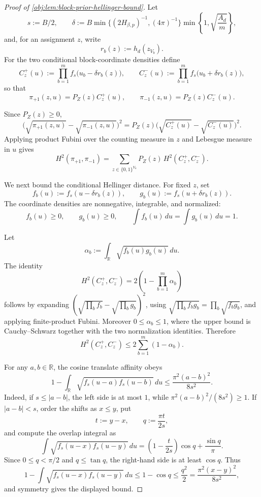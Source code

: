 \documentclass[11pt]{article}
\begin{document}
\begin{proof}[Proof of \cref{obj:lem:block-prior-hellinger-bound}]
Let
\[
s:=B/2,
\qquad
\delta:=B\min\{(2H_{\beta,p})^{-1},(4\pi)^{-1}\}
  \min\left\{1,\sqrt{\frac{A_d}{m}}\right\},
\]
and, for an assignment \(z\), write
\[
r_b(z):=h_d(z_{V_b}) .
\]
For the two conditional block-coordinate densities define
\[
C_z^+(u):=\prod_{b=1}^{m} f_s\bigl(u_b-\delta r_b(z)\bigr),
\qquad
C_z^-(u):=\prod_{b=1}^{m} f_s\bigl(u_b+\delta r_b(z)\bigr),
\]
so that
\[
\pi_{+1}(z,u)=P_Z(z)C_z^+(u),
\qquad
\pi_{-1}(z,u)=P_Z(z)C_z^-(u).
\]

Since \(P_Z(z)\ge0\),
\[
\bigl(\sqrt{\pi_{+1}(z,u)}-\sqrt{\pi_{-1}(z,u)}\bigr)^2
=
P_Z(z)\bigl(\sqrt{C_z^+(u)}-\sqrt{C_z^-(u)}\bigr)^2 .
\]
Applying product Fubini over the counting measure in \(z\) and Lebesgue measure in \(u\) gives
\[
H^2(\pi_{+1},\pi_{-1})
=
\sum_{z\in\{0,1\}^{V_n}}
P_Z(z)\,
H^2(C_z^+,C_z^-).
\]

We next bound the conditional Hellinger distance.  For fixed \(z\), set
\[
f_b(u):=f_s(u-\delta r_b(z)),
\qquad
g_b(u):=f_s(u+\delta r_b(z)).
\]
The coordinate densities are nonnegative, integrable, and normalized:
\[
f_b(u)\ge0,\qquad g_b(u)\ge0,\qquad
\int f_b(u)\,du=\int g_b(u)\,du=1 .
\]

Let
\[
\alpha_b:=\int_{\mathbb R}\sqrt{f_b(u)g_b(u)}\,du .
\]
The identity
\[
H^2(C_z^+,C_z^-)
=
2\left(1-\prod_{b=1}^{m}\alpha_b\right)
\]
follows by expanding
\((\sqrt{\prod_b f_b}-\sqrt{\prod_b g_b})^2\), using
\(\sqrt{\prod_b f_b g_b}=\prod_b\sqrt{f_b g_b}\), and applying finite-product Fubini.  Moreover \(0\le\alpha_b\le1\), where the upper bound is Cauchy--Schwarz together with the two normalization identities.  Therefore
\[
H^2(C_z^+,C_z^-)
\le
2\sum_{b=1}^{m}(1-\alpha_b).
\]

For any \(a,b\in\mathbb R\), the cosine translate affinity obeys
\[
1-\int_{\mathbb R}\sqrt{f_s(u-a)f_s(u-b)}\,du
\le
\frac{\pi^2(a-b)^2}{8s^2}.
\]
Indeed, if \(s\le |a-b|\), the left side is at most \(1\), while
\(\pi^2(a-b)^2/(8s^2)\ge1\).  If \(|a-b|<s\), order the shifts as \(x\le y\), put
\[
t:=y-x,
\qquad
q:=\frac{\pi t}{2s},
\]
and compute the overlap integral as
\[
\int\sqrt{f_s(u-x)f_s(u-y)}\,du
=
\left(1-\frac{t}{2s}\right)\cos q+\frac{\sin q}{\pi}.
\]
Since \(0\le q<\pi/2\) and \(q\le\tan q\), the right-hand side is at least \(\cos q\).  Thus
\[
1-\int\sqrt{f_s(u-x)f_s(u-y)}\,du
\le
1-\cos q
\le
\frac{q^2}{2}
=
\frac{\pi^2(x-y)^2}{8s^2},
\]
and symmetry gives the displayed bound. %


\end{proof}
\end{document}
